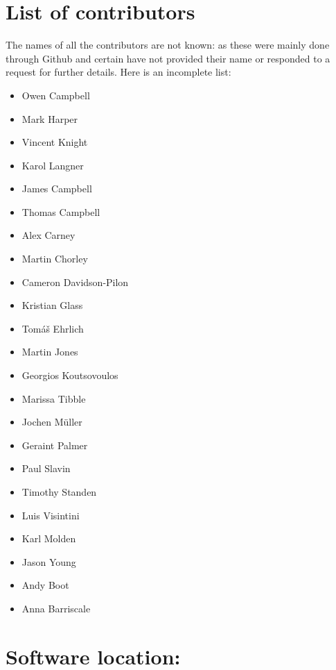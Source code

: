 \documentclass{jors}
\begin{document}
\section*{List of contributors}

The names of all the contributors are not known: as these were mainly done
through Github and certain have not provided their name or responded to a
request for further details. Here is an incomplete list:

\begin{multicols}{2}
    \begin{itemize}[noitemsep,topsep=0pt]
        \item {Owen Campbell}
        \item {Mark Harper}
        \item {Vincent Knight}
        \item {Karol Langner}
        \item {James Campbell}
        \item {Thomas Campbell}
        \item {Alex Carney}
        \item {Martin Chorley}
        \item {Cameron Davidson-Pilon}
        \item {Kristian Glass}
        \item {Tom{\'a}{\v s} Ehrlich}
        \item {Martin Jones}
        \item {Georgios Koutsovoulos}
        \item {Marissa Tibble}
        \item {Jochen M{\"u}ller}
        \item {Geraint Palmer}
        \item {Paul Slavin}
        \item {Timothy Standen}
        \item {Luis Visintini}
        \item {Karl Molden}
        \item {Jason Young}
        \item {Andy Boot}
        \item {Anna Barriscale}
    \end{itemize}
\end{multicols}

\section*{Software location:}
\end{document}

